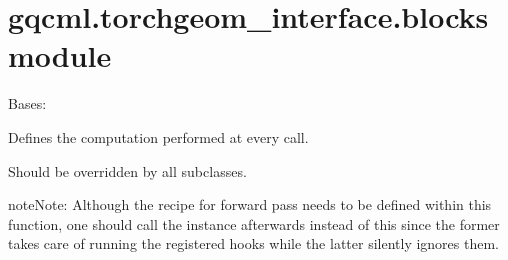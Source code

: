 \documentclass[letterpaper,10pt,english]{sphinxmanual}
\begin{document}
\section{gqcml.torchgeom\_interface.blocks module}
\label{\detokenize{modules/gqcml.torchgeom_interface:module-gqcml.torchgeom_interface.blocks}}\label{\detokenize{modules/gqcml.torchgeom_interface:gqcml-torchgeom-interface-blocks-module}}

\begin{fulllineitems}
\label{\detokenize{modules/gqcml.torchgeom_interface:gqcml.torchgeom_interface.blocks.GCNConv_block}}
Bases: 

\begin{fulllineitems}
\label{\detokenize{modules/gqcml.torchgeom_interface:gqcml.torchgeom_interface.blocks.GCNConv_block.forward}}
Defines the computation performed at every call.

Should be overridden by all subclasses.

\begin{sphinxadmonition}{note}{Note:}
Although the recipe for forward pass needs to be defined within
this function, one should call the  instance afterwards
instead of this since the former takes care of running the
registered hooks while the latter silently ignores them.
\end{sphinxadmonition}


\end{fulllineitems}
\end{fulllineitems}
\end{document}
